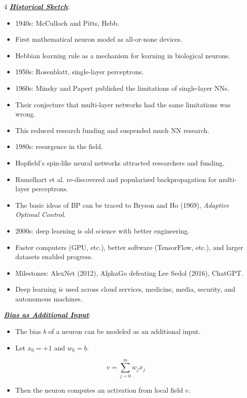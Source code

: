 \documentclass[12pt]{article}
\newcommand{\bulletPoint}[1]{\ul{\textit{\textbf{#1}}}}
\begin{document}
\begin{multicols*}{4}
\bulletPoint{Historical Sketch}:
\begin{itemize}
\item 1940s: McCulloch and Pitts, Hebb.
\item First mathematical neuron model as all-or-none devices.
\item Hebbian learning rule as a mechanism for learning in biological neurons.
\item 1950s: Rosenblatt, single-layer perceptrons.
\item 1960s: Minsky and Papert published the limitations of single-layer NNs.
\item Their conjecture that multi-layer networks had the same limitations was wrong.
\item This reduced research funding and suspended much NN research.
\item 1980s: resurgence in the field.
\item Hopfield's spin-like neural networks attracted researchers and funding.
\item Rumelhart et al. re-discovered and popularized backpropagation for multi-layer perceptrons.
\item The basic ideas of BP can be traced to Bryson and Ho (1969), \textit{Adaptive Optimal Control}.
\item 2000s: deep learning is old science with better engineering.
\item Faster computers (GPU, etc.), better software (TensorFlow, etc.), and larger datasets enabled progress.
\item Milestones: AlexNet (2012), AlphaGo defeating Lee Sedol (2016), ChatGPT.
\item Deep learning is used across cloud services, medicine, media, security, and autonomous machines.
\end{itemize}

\bulletPoint{Bias as Additional Input}:
\begin{itemize}
\item The bias $b$ of a neuron can be modeled as an additional input.
\item Let $x_0=+1$ and $w_0=b$.
\end{itemize}
\useshortskip
\begin{equation*}
    v=\sum_{j=0}^{m} w_j x_j
\end{equation*}
\begin{itemize}
\item Then the neuron computes an activation from local field $v$.
\end{itemize}


\end{multicols*}
\end{document}
